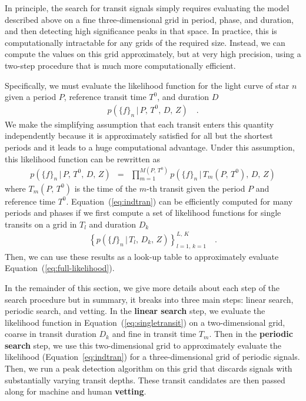 \documentclass[12pt,preprint]{aastex}
\newcommand{\Eq}[1]{Equation~(\ref{eq:#1})}
\newcommand{\eq}[1]{\Eq{#1}}
\newcommand{\eqalt}[1]{Equation~\ref{eq:#1}}
\newcommand{\eqlabel}[1]{\label{eq:#1}}
\newcommand{\flux}{{\ensuremath{f}}}
\newcommand{\period}{{\ensuremath{P}}}
\newcommand{\phase}{{\ensuremath{T^0}}}
\newcommand{\duration}{{\ensuremath{D}}}
\newcommand{\depth}{{\ensuremath{Z}}}
\newcommand{\transittime}{{\ensuremath{T}}}
\begin{document}
In principle, the search for transit signals simply requires evaluating the
model described above on a fine three-dimensional grid in period, phase, and
duration, and then detecting high significance peaks in that space.
In practice, this is computationally intractable for any grids of the
required size.
Instead, we can compute the values on this grid approximately, but at very
high precision, using a two-step procedure that is much more computationally
efficient.

Specifically, we must evaluate the likelihood function for the light curve of
star $n$ given a period \period, reference transit time \phase, and duration
\duration
\begin{eqnarray}\eqlabel{full-likelihood}
p(\{\flux\}_n\,|\,\period,\,\phase,\,\duration,\,\depth) \quad.
\end{eqnarray}
We make the simplifying assumption that each transit enters this quantity
independently because it is approximately satisfied for all but the shortest
periods and it leads to a huge computational advantage.
Under this assumption, this likelihood function can be rewritten as
\begin{eqnarray}\eqlabel{indtran}
p(\{\flux\}_n\,|\,\period,\,\phase,\,\duration,\,\depth) &=&
\prod_{m=1}^{M(\period,\,\phase)}
    p(\{\flux\}_n\,|\,\transittime_m(\period,\,\phase),\,\duration,\,
                    \depth)
\end{eqnarray}
where $\transittime_m(\period,\,\phase)$ is the time of the $m$-th
transit given the period $\period$ and reference time $\phase$.
\Eq{indtran} can be efficiently computed for many periods and phases if we
first compute a set of likelihood functions for single transits on a grid
in $\transittime_l$ and duration $\duration_k$
\begin{eqnarray}\eqlabel{singletransit}
\left \{ p(\{\flux\}_n\,|\,\transittime_l,\,\duration_k,\,\depth)
\right\}_{l=1,\,k=1}^{L,\,K} \quad.
\end{eqnarray}
Then, we can use these results as a look-up table to approximately evaluate
\eq{full-likelihood}.

In the remainder of this section, we give more details about each step of the
search procedure but in summary, it breaks into three main steps: linear
search, periodic search, and vetting.
In the {\bf linear search} step, we evaluate the likelihood function in
\eq{singletransit} on a two-dimensional grid, coarse in transit duration
$\duration_k$ and fine in transit time $\transittime_m$.
Then in the {\bf periodic search} step, we use this two-dimensional grid to
approximately evaluate the likelihood (\eqalt{indtran}) for a
three-dimensional grid of periodic signals.
Then, we run a peak detection algorithm on this grid that discards signals
with substantially varying transit depths.
These transit candidates are then passed along for machine and human {\bf
vetting}.
\end{document}
